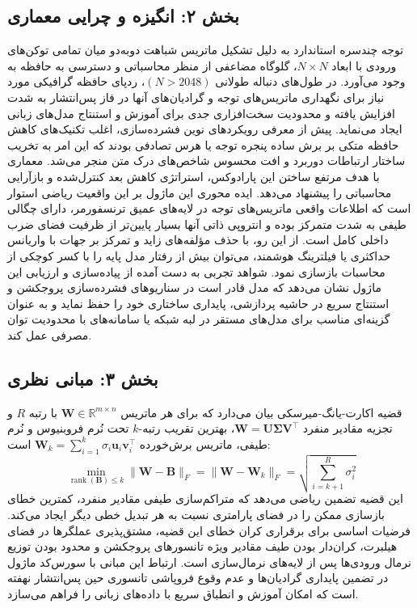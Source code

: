 \subsection*{بخش ۲: انگیزه و چرایی معماری }
توجه چندسره استاندارد  به دلیل تشکیل ماتریس شباهت دو‌به‌دو میان تمامی توکن‌های ورودی با ابعاد $N \times N$، گلوگاه مضاعفی از منظر محاسباتی و دسترسی به حافظه به وجود می‌آورد. در طول‌های دنباله طولانی $(N > 2048)$، ردپای حافظه گرافیکی مورد نیاز برای نگهداری ماتریس‌های توجه و گرادیان‌های آنها در فاز پس‌انتشار به شدت افزایش یافته و محدودیت سخت‌افزاری جدی برای آموزش و استنتاج مدل‌های زبانی ایجاد می‌نماید.
پیش از معرفی رویکردهای نوین فشرده‌سازی، اغلب تکنیک‌های کاهش حافظه متکی بر برش ساده پنجره توجه  یا هرس تصادفی بودند که این امر به تخریب ساختار ارتباطات دوربرد و افت محسوس شاخص‌های درک متن منجر می‌شد. معماری  با هدف مرتفع ساختن این پارادوکس، استراتژی کاهش بعد کنترل‌شده و بازآرایی محاسباتی را پیشنهاد می‌دهد.
ایده محوری این ماژول بر این واقعیت ریاضی استوار است که اطلاعات واقعی ماتریس‌های توجه در لایه‌های عمیق ترنسفورمر، دارای چگالی طیفی به شدت متمرکز بوده و انتروپی ذاتی آنها بسیار پایین‌تر از ظرفیت فضای ضرب داخلی کامل است. از این رو، با حذف مؤلفه‌های زاید و تمرکز بر جهات با واریانس حداکثری یا فیلترینگ هوشمند، می‌توان بیش از  رفتار مدل پایه را با کسر کوچکی از محاسبات بازسازی نمود.
شواهد تجربی به دست آمده از پیاده‌سازی و ارزیابی این ماژول نشان می‌دهد که مدل قادر است در سناریوهای فشرده‌سازی پروجکشن و استنتاج سریع در حاشیه پردازشی، پایداری ساختاری خود را حفظ نماید و به عنوان گزینه‌ای مناسب برای مدل‌های مستقر در لبه شبکه یا سامانه‌های با محدودیت توان مصرفی عمل کند.

\subsection*{بخش ۳: مبانی نظری }
قضیه اکارت-یانگ-میرسکی بیان می‌دارد که برای هر ماتریس $\mathbf{W} \in \mathbb{R}^{m \times n}$ با رتبه $R$ و تجزیه مقادیر منفرد $\mathbf{W} = \mathbf{U} \mathbf{\Sigma} \mathbf{V}^\top$، بهترین تقریب رتبه-$k$ تحت نُرم فروبنیوس و نُرم طیفی، ماتریس برش‌خورده $\mathbf{W}_k = \sum_{i=1}^k \sigma_i \mathbf{u}_i \mathbf{v}_i^\top$ است: 
$$\min_{\operatorname{rank}(\mathbf{B}) \le k} \|\mathbf{W} - \mathbf{B}\|_F = \|\mathbf{W} - \mathbf{W}_k\|_F = \sqrt{\sum_{i=k+1}^R \sigma_i^2}$$
این قضیه تضمین ریاضی می‌دهد که متراکم‌سازی طیفی مقادیر منفرد، کمترین خطای بازسازی ممکن را در فضای پارامتری نسبت به هر تبدیل خطی دیگر ایجاد می‌کند.
فرضیات اساسی برای برقراری کران خطای این قضیه، مشتق‌پذیری عملگرها در فضای هیلبرت، کران‌دار بودن طیف مقادیر ویژه تانسورهای پروجکشن و محدود بودن توزیع نرمال ورودی‌ها پس از لایه‌های نرمال‌سازی  است.
ارتباط این مبانی با سورس‌کد ماژول  در تضمین پایداری گرادیان‌ها و عدم وقوع فروپاشی تانسوری حین پس‌انتشار نهفته است که امکان آموزش و انطباق سریع با داده‌های زبانی را فراهم می‌سازد.

